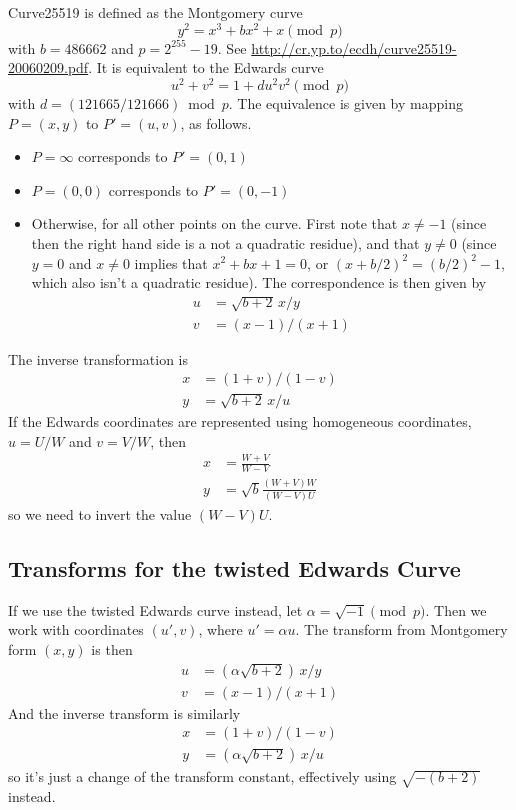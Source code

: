 \documentclass[a4paper]{article}
\begin{document}
Curve25519 is defined as the Montgomery curve
\begin{equation*}
  y^2 = x^3 + b x^2 + x \pmod p
\end{equation*}
with $b = 486662$ and $p = 2^{255} -19$. See
\url{http://cr.yp.to/ecdh/curve25519-20060209.pdf}. It is equivalent
to the Edwards curve
\begin{equation*}
  u^2 + v^2 = 1 + d u^2 v^2 \pmod p
\end{equation*}
with $d = (121665/121666) \bmod p$. The equivalence is given by
mapping $P = (x,y)$ to $P' = (u, v)$, as follows.
\begin{itemize}
\item $P = \infty$ corresponds to $P' = (0, 1)$
\item $P = (0, 0)$ corresponds to $P' = (0, -1)$
\item Otherwise, for all other points on the curve. First note that $x
  \neq -1$ (since then the right hand side is a not a quadratic
  residue), and that $y \neq 0$ (since $y = 0$ and $x \neq 0$ implies
  that $x^2 + bx + 1 = 0$, or $(x + b/2)^2 = (b/2)^2 - 1$, which also
  isn't a quadratic residue). The correspondence is then given by
  \begin{align*}
    u &= \sqrt{b+2} \, x / y \\
    v &= (x-1) / (x+1)
  \end{align*}
\end{itemize}

The inverse transformation is
\begin{align*}
  x &= (1+v) / (1-v) \\
  y &= \sqrt{b+2} \, x / u
\end{align*}
If the Edwards coordinates are represented using homogeneous
coordinates, $u = U/W$ and $v = V/W$, then
\begin{align*}
  x &= \frac{W+V}{W-V} \\
  y &= \sqrt{b} \frac{(W+V) W}{(W-V) U}
\end{align*}
so we need to invert the value $(W-V) U$.

\subsection{Transforms for the twisted Edwards Curve}

If we use the twisted Edwards curve instead, let $\alpha = \sqrt{-1}
\pmod{p}$. Then we work with coordinates $(u', v)$, where $u' = \alpha
u$. The transform from Montgomery form $(x, y)$ is then
\begin{align*}
  u &= (\alpha \sqrt{b+2}) \, x / y\\
  v &= (x-1) / (x+1)
\end{align*}
And the inverse transform is similarly
\begin{align*}
  x &= (1+v) / (1-v) \\
  y &= (\alpha \sqrt{b+2}) \, x / u
\end{align*}
so it's just a change of the transform constant, effectively using
$\sqrt{-(b+2)}$ instead.
\end{document}
